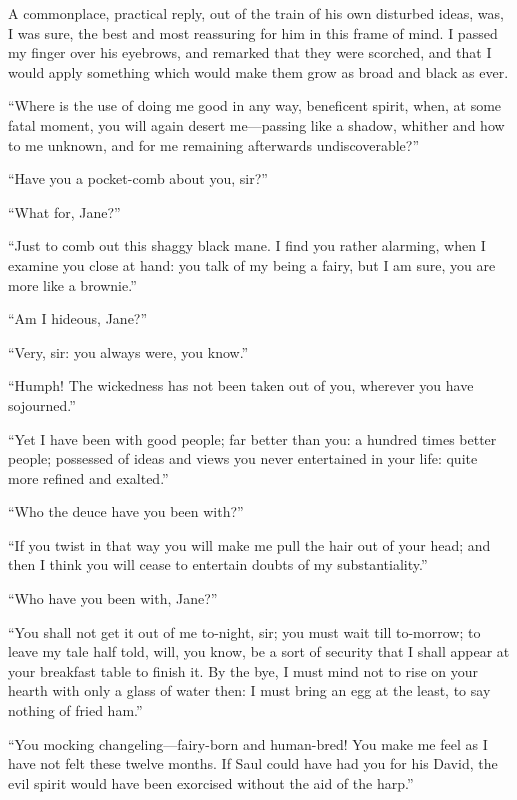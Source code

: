 A commonplace, practical reply, out of the train of his own disturbed
ideas, was, I was sure, the best and most reassuring for him in this
frame of mind. I passed my finger over his eyebrows, and remarked that
they were scorched, and that I would apply something which would make
them grow as broad and black as ever.

\enquote{Where is the use of doing me good in any way, beneficent spirit, when,
	at some fatal moment, you will again desert me---passing like a shadow,
	whither and how to me unknown, and for me remaining afterwards
	undiscoverable?} %

\enquote{Have you a pocket-comb about you, sir?}

\enquote{What for, Jane?}

\enquote{Just to comb out this shaggy black mane. I find you rather
	alarming, when I examine you close at hand: you talk of my being a
	fairy, but I am sure, you are more like a brownie.}

\enquote{Am I hideous, Jane?}

\enquote{Very, sir: you always were, you know.}

\enquote{Humph! The wickedness has not been taken out of you, wherever
	you have sojourned.}

\enquote{Yet I have been with good people; far better than you: a
	hundred times better people; possessed of ideas and views you never
	entertained in your life: quite more refined and exalted.}

\enquote{Who the deuce have you been with?}

\enquote{If you twist in that way you will make me pull the hair out of
	your head; and then I think you will cease to entertain doubts of my
	substantiality.}

\enquote{Who have you been with, Jane?}

\enquote{You shall not get it out of me to-night, sir; you must wait
	till to-morrow; to leave my tale half told, will, you know, be a sort of
	security that I shall appear at your breakfast table to finish it. By
	the bye, I must mind not to rise on your hearth with only a glass of
	water then: I must bring an egg at the least, to say nothing of fried
	ham.}

\enquote{You mocking changeling---fairy-born and human-bred! You make
	me feel as I have not felt these twelve months. If Saul could have had
	you for his David, the evil spirit would have been exorcised without the
	aid of the harp.}

